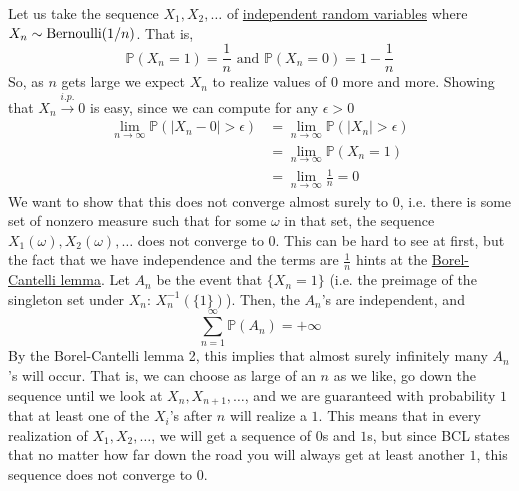  \begin{example}
    \label{ex:c-in-probability-centernotimplies-c-almost-2}
    Let us take the sequence $X_1, X_2, \ldots$ of \hyperref[def:independent-random-variables]{independent random variables} where $X_n \sim \operatorname{Bernoulli}(1/n)$. That is, 
    \begin{equation}
      \mathbb{P}(X_n = 1) = \frac{1}{n} \text{ and } \mathbb{P}(X_n = 0) = 1 - \frac{1}{n}
    \end{equation}
    So, as $n$ gets large we expect $X_n$ to realize values of $0$ more and more. Showing that $X_n \xrightarrow{i.p.} 0$ is easy, since we can compute for any $\epsilon > 0$
    \begin{align*}
      \lim_{n \rightarrow \infty} \mathbb{P}(|X_n - 0| > \epsilon) & = \lim_{n \rightarrow \infty} \mathbb{P}(|X_n| > \epsilon) \\
      & = \lim_{n \rightarrow \infty} \mathbb{P}(X_n = 1) \\
      & = \lim_{n \rightarrow \infty} \frac{1}{n} = 0
    \end{align*}
    We want to show that this does not converge almost surely to $0$, i.e. there is some set of nonzero measure such that for some $\omega$ in that set, the sequence $X_1 (\omega), X_2(\omega), \ldots$ does not converge to $0$. This can be hard to see at first, but the fact that we have independence and the terms are $\frac{1}{n}$ hints at the \hyperref[mt-thm:borel-cantelli-lemma]{Borel-Cantelli lemma}. Let $A_n$ be the event that $\{X_n = 1\}$ (i.e. the preimage of the singleton set under $X_n$: $X_n^{-1} ( \{1\})$). Then, the $A_n$'s are independent, and 
    \begin{equation}
      \sum_{n=1}^\infty \mathbb{P}(A_n) = +\infty
    \end{equation}
    By the Borel-Cantelli lemma 2, this implies that almost surely infinitely many $A_n$'s will occur. That is, we can choose as large of an $n$ as we like, go down the sequence until we look at $X_n, X_{n+1}, \ldots$, and we are guaranteed with probability $1$ that at least one of the $X_i$'s after $n$ will realize a $1$. This means that in every realization of $X_1, X_2, \ldots$, we will get a sequence of $0$s and $1$s, but since BCL states that no matter how far down the road you will always get at least another $1$, this sequence does not converge to $0$.  
  \end{example}

